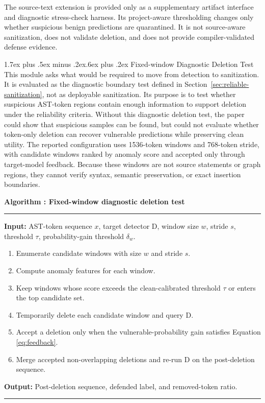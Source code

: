 \documentclass[letterpaper,twocolumn,10pt,twoside]{article}
\makeatletter
\renewcommand\subsection{\@startsection{subsection}{2}{\z@}%
  {1.7ex plus .5ex minus .2ex}{.6ex plus .2ex}%
  {\normalfont\normalsize\bfseries}}
\newcounter{algorithm}
\newenvironment{algorithmblock}[1]{%
  \refstepcounter{algorithm}%
  \par\medskip\noindent\begin{lrbox}{\algbox}\begin{minipage}{0.94\columnwidth}
  \small
  \textbf{Algorithm \thealgorithm: #1}\par
  \vspace{2pt}\hrule\vspace{3pt}
}{%
  \vspace{2pt}\hrule
  \end{minipage}\end{lrbox}\fbox{\usebox{\algbox}}\par\medskip
}
\newcommand{\alginput}[1]{\noindent\textbf{Input:} #1\par}
\newcommand{\algoutput}[1]{\noindent\textbf{Output:} #1\par}
\newenvironment{algsteps}{\begin{enumerate}[label=\arabic*:,leftmargin=1.8em,itemsep=1pt,topsep=2pt]}{\end{enumerate}}
\makeatother
\begin{document}
The source-text extension is provided only as a supplementary artifact interface and diagnostic stress-check harness. Its project-aware thresholding changes only whether suspicious benign predictions are quarantined. It is not source-aware sanitization, does not validate deletion, and does not provide compiler-validated defense evidence.

\subsection{Fixed-window Diagnostic Deletion Test}
This module asks what would be required to move from detection to sanitization. It is evaluated as the diagnostic boundary test defined in Section~\ref{sec:reliable-sanitization}, not as deployable sanitization. Its purpose is to test whether suspicious AST-token regions contain enough information to support deletion under the reliability criteria. Without this diagnostic deletion test, the paper could show that suspicious samples can be found, but could not evaluate whether token-only deletion can recover vulnerable predictions while preserving clean utility. The reported configuration uses 1536-token windows and 768-token stride, with candidate windows ranked by anomaly score and accepted only through target-model feedback. Because these windows are not source statements or graph regions, they cannot verify syntax, semantic preservation, or exact insertion boundaries.

\begin{algorithmblock}{Fixed-window diagnostic deletion test}
\label{alg:window}
\alginput{AST-token sequence $x$, target detector $\mathrm{D}$, window size $w$, stride $s$, threshold $\tau$, probability-gain threshold $\delta_w$.}
\begin{algsteps}
  \item Enumerate candidate windows with size $w$ and stride $s$.
  \item Compute anomaly features for each window.
  \item Keep windows whose score exceeds the clean-calibrated threshold $\tau$ or enters the top candidate set.
  \item Temporarily delete each candidate window and query $\mathrm{D}$.
  \item Accept a deletion only when the vulnerable-probability gain satisfies Equation \eqref{eq:feedback}.
  \item Merge accepted non-overlapping deletions and re-run $\mathrm{D}$ on the post-deletion sequence.
\end{algsteps}
\algoutput{Post-deletion sequence, defended label, and removed-token ratio.}
\end{algorithmblock}
\end{document}

